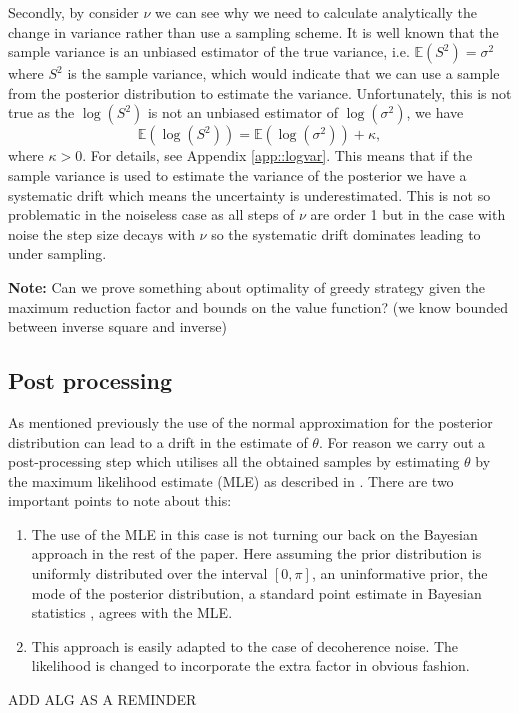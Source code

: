 Secondly, by consider $\nu$ we can see why we need to calculate analytically the change in variance rather than use a sampling scheme. It is well known that the sample variance is an unbiased estimator of the true variance, i.e. $\mathbb{E}(S^2)=\sigma^2$ where $S^2$ is the sample variance, which would indicate that we can use a sample from the posterior distribution to estimate the variance. Unfortunately, this is not true as the $\log(S^2)$ is not an unbiased estimator of $\log(\sigma^2)$, we have $$ \mathbb{E}(\log(S^2)) = \mathbb{E}(\log(\sigma^2)) +\kappa, $$ where $\kappa>0$. For details, see Appendix \ref{app::logvar}. This means that if the sample variance is used to estimate the variance of the posterior we have a systematic drift which means the uncertainty is underestimated. This is not so problematic in the noiseless case as all steps of $\nu$ are order 1 but in the case with noise the step size decays with $\nu$ so the systematic drift dominates leading to under sampling.



{\color{red} {\bf Note:} Can we prove something about optimality of greedy strategy given the maximum reduction factor and bounds on the value function? (we know bounded between inverse square and inverse)}



\subsection{Post processing}\label{sec::post}
As mentioned previously the use of the normal approximation for the posterior distribution can lead to a drift in the estimate of $\theta$. For reason we carry out a post-processing step which utilises all the obtained samples by estimating $\theta$ by the maximum likelihood estimate (MLE) as described in \cite{}. There are two important points to note about this:
\begin{enumerate}\item The use of the MLE in this case is not turning our back on the Bayesian approach in the rest of the paper. Here assuming the prior distribution is uniformly distributed over the interval $[0,\pi]$, an uninformative prior, the mode of the posterior distribution, a standard point estimate in Bayesian statistics \cite{}, agrees with the MLE.
\item This approach is easily adapted to the case of decoherence noise. The likelihood is changed to incorporate the extra factor in obvious fashion.
\end{enumerate}

ADD ALG AS A REMINDER

\newpage
